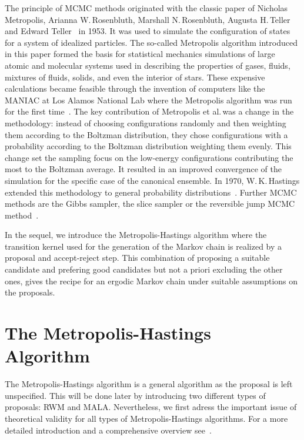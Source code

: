 The principle of MCMC methods originated with the classic paper of Nicholas Metropolis, Arianna W.\,Rosenbluth, Marshall N.\,Rosenbluth, Augusta H.\,Teller and Edward Teller~\autocite{Metropolis1953} in 1953. It was used to simulate the configuration of states for a system of idealized particles. The so-called Metropolis algorithm introduced in this paper formed the basis for statistical mechanics simulations of large atomic and molecular systems used in describing the properties of gases, fluids, mixtures of fluids, solids, and even the interior of stars. These expensive calculations became feasible through the invention of computers like the MANIAC at Los Alamos National Lab where the Metropolis algorithm was run for the first time~\autocites{MCAtWork1987, UlamNeumannMC1987}. 
The key contribution of Metropolis et al.\,was a change in the methodology: instead of choosing configurations randomly and then weighting them according to the Boltzman distribution, they chose configurations with a probability according to the Boltzman distribution weighting them evenly. This change set the sampling focus on the low-energy configurations contributing the most to the Boltzman average. It resulted in an improved convergence of the simulation for the specific case of the canonical ensemble. In 1970, W.\,K.\,Hastings extended this methodology to general probability distributions~\autocite{Hastings1970}. Further MCMC methods are the Gibbs sampler, the slice sampler or the reversible jump MCMC method~\autocite{Robert2005}.


In the sequel, we introduce the Metropolis-Hastings algorithm where the transition kernel used for the generation of the Markov chain is realized by a proposal and accept-reject step. This combination of proposing a suitable candidate and prefering good candidates but not a priori excluding the other ones, gives the recipe for an ergodic Markov chain under suitable assumptions on the proposals.

\section{The Metropolis-Hastings Algorithm}
\label{MH-TheMetropolis-HastingsAlgo}

The Metropolis-Hastings algorithm is a general algorithm as the proposal is left unspecified. This will be done later by introducing two different types of proposals: RWM and MALA. Nevertheless, we first adress the important issue of theoretical validity for all types of Metropolis-Hastings algorithms. For a more detailed introduction and a comprehensive overview see~\autocite{Robert2005}.

